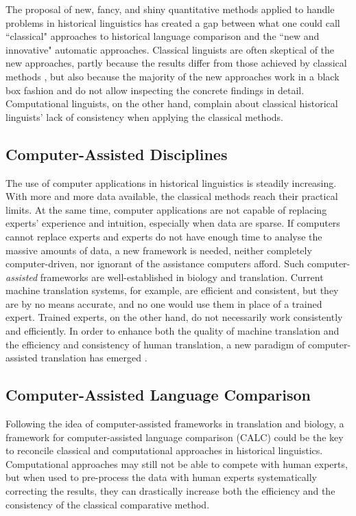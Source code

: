 \documentclass[xetex,svgnames]{scrartcl}
\begin{document}
The proposal of new, fancy, and shiny quantitative methods applied to handle problems in historical
linguistics has created a gap between what one could call ``classical" approaches to historical
language comparison and the ``new and innovative" automatic approaches.
Classical linguists are often skeptical of the new approaches, partly because the results differ from
those achieved by classical methods \citep{Anthony2015,Holm2007}, but also because the majority of the
new approaches work in a black box fashion and do not allow inspecting the concrete findings in
detail. Computational linguists, on the other hand, complain about classical historical linguists' lack
of consistency when applying the classical methods.

\subsection{Computer-Assisted Disciplines}

The use of computer applications in historical linguistics is steadily increasing. With more and
more data available, the classical methods reach their practical limits. At the same time, computer
applications are not capable of replacing experts' experience and intuition, especially when data
are sparse. If computers cannot replace experts and experts do not have enough time to analyse the
massive amounts of data, a new framework is needed, neither completely computer-driven, nor ignorant
of the assistance computers afford. Such computer-\emph{assisted} frameworks are well-established in
biology and translation. Current machine translation systems, for example, are efficient and
consistent, but they are by no means accurate, and no one would use them in place of a trained
expert. Trained experts, on the other hand, do not necessarily work consistently and efficiently. In
order to enhance both the quality of machine translation and the efficiency and consistency of human
translation, a new paradigm of computer-assisted translation has emerged \citep[3]{Barrachina2008}.

\subsection{Computer-Assisted Language Comparison}

Following the idea of computer-assisted frameworks in translation and biology, a framework for
computer-assisted language comparison (CALC) could be the key to reconcile classical and
computational approaches in historical linguistics. Computational approaches may still not be able
to compete with human experts, but when used to pre-process the data with human experts
systematically correcting the results, they can drastically increase both the efficiency and the
consistency of the classical comparative method.
\end{document}
